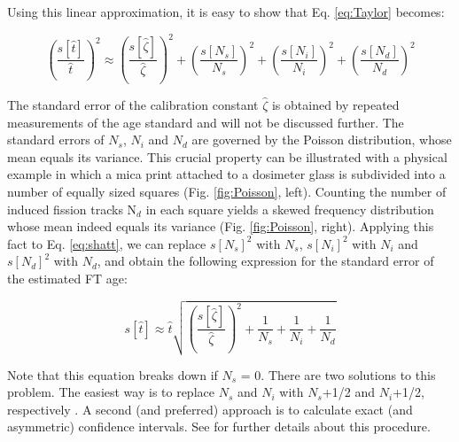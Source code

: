 \documentclass{article}
\begin{document}
Using this linear approximation, it is easy to show that Eq.
\ref{eq:Taylor} becomes:

\begin{equation}
\left(\frac{s[\hat{t}]}{\hat{t}}\right)^2 \approx 
\left(\frac{s[\hat{\zeta}]}{\hat{\zeta}}\right)^2 +
\left(\frac{s[N_s]}{N_s}\right)^2 +
\left(\frac{s[N_i]}{N_i}\right)^2 +
\left(\frac{s[N_d]}{N_d}\right)^2
\label{eq:shatt}
\end{equation}

The standard error of the calibration constant $\hat{\zeta}$ is
obtained by repeated measurements of the age standard and will not be
discussed further. The standard errors of $N_s$, $N_i$ and $N_d$ are
governed by the Poisson distribution, whose mean equals its variance.
This crucial property can be illustrated with a physical example in
which a mica print attached to a dosimeter glass is subdivided into a
number of equally sized squares (Fig. \ref{fig:Poisson},
left). Counting the number of induced fission tracks N$_d$ in each
square yields a skewed frequency distribution whose mean indeed equals
its variance (Fig. \ref{fig:Poisson}, right). Applying this fact to
Eq. \ref{eq:shatt}, we can replace $s[N_s]^2$ with $N_s$, $s[N_i]^2$
with $N_i$ and $s[N_d]^2$ with $N_d$, and obtain the following
expression for the standard error of the estimated FT age:

\begin{equation}
s[\hat{t}] \approx \hat{t} \sqrt{ 
\left(\frac{s[\hat{\zeta}]}{\hat{\zeta}}\right)^2 +
\frac{1}{N_s} +
\frac{1}{N_i} +
\frac{1}{N_d}
}
\label{eq:shatt2}
\end{equation}

Note that this equation breaks down if $N_s$ = 0. There are two
solutions to this problem. The easiest way is to replace $N_s$ and
$N_i$ with $N_s$+1/2 and $N_i$+1/2, respectively
\citep[][p.80]{galbraith2005}. A second (and preferred) approach is to
calculate exact (and asymmetric) confidence intervals. See
\citet[][p.50]{galbraith2005} for further details about this
procedure.
\end{document}
